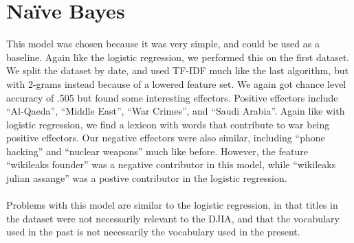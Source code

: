 \documentclass{article}
\begin{document}
\section{Na\"ive Bayes}
This model was chosen because it was very simple, and could be used as a baseline. Again like the logistic regression,
 we performed this on the first dataset. We split the dataset by date, and used TF-IDF much like the last algorithm,
 but with 2-grams instead because of a lowered feature set. We again got chance level accuracy of .505 but found some
 interesting effectors. Positive effectors include “Al-Qaeda”, “Middle East”, “War Crimes”, and “Saudi Arabia”. Again
 like with logistic regression, we find a lexicon with words that contribute to war being positive effectors. Our negative
 effectors were also similar, including “phone hacking” and “nuclear weapons” much like before. However, the feature
 “wikileaks  founder” was a negative contributor in this model, while “wikileaks julian assange” was a postive contributor
 in the logistic regression. 
\\\\
Problems with this model are similar to the logistic regression, in that titles in the dataset were not necessarily relevant
 to the DJIA, and that the vocabulary used in the past is not necessarily the vocabulary used in the present.
\end{document}

